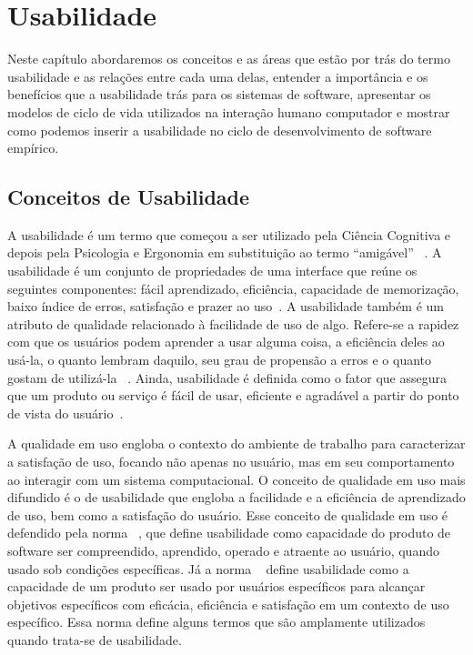 \chapter{Usabilidade}

Neste capítulo abordaremos os conceitos e as áreas que estão por trás do termo usabilidade e as relações entre cada uma delas, entender a importância e os benefícios que a usabilidade trás para os sistemas de software, apresentar os modelos de ciclo de vida utilizados na interação humano computador e mostrar como podemos inserir a usabilidade no ciclo de desenvolvimento de software empírico.

\section{Conceitos de Usabilidade}

A usabilidade é um termo que começou a ser utilizado pela Ciência Cognitiva e depois pela Psicologia e Ergonomia em substituição ao termo ``amigável'' ~\cite{dias2006}.
% 
A usabilidade é um conjunto de propriedades de uma interface que reúne os seguintes componentes: fácil aprendizado, eficiência, capacidade de memorização, baixo índice de erros, satisfação e prazer ao uso~\cite{nielsen1994}.
%
A usabilidade também é um atributo de qualidade relacionado à facilidade de uso de algo. Refere-se a rapidez com que os usuários podem aprender a usar alguma coisa, a eficiência deles ao usá-la, o quanto lembram daquilo, seu grau de propensão a erros e o quanto gostam de utilizá-la ~\cite{nielsen2007}. 
%
Ainda, usabilidade é definida como o fator que assegura que um produto ou serviço é fácil de usar, eficiente e agradável a partir do ponto de vista do usuário~\cite{preece2007}.


A qualidade em uso engloba o contexto do ambiente de trabalho para caracterizar a satisfação de uso, focando não apenas no usuário, mas em seu comportamento ao interagir com um sistema computacional.
%
O conceito de qualidade em uso mais difundido é o de usabilidade que engloba a facilidade e a eficiência de aprendizado de uso, bem como a satisfação do usuário.
%
Esse conceito de qualidade em uso é defendido pela norma ~, que define usabilidade como  capacidade do produto de software ser compreendido, aprendido, operado e atraente ao usuário, quando usado sob condições específicas.
%
Já a norma ~ define usabilidade como a capacidade de um produto ser usado por usuários específicos para alcançar objetivos específicos com eficácia, eficiência e satisfação em um contexto de uso específico. Essa norma define alguns termos que são amplamente utilizados quando trata-se de usabilidade.

